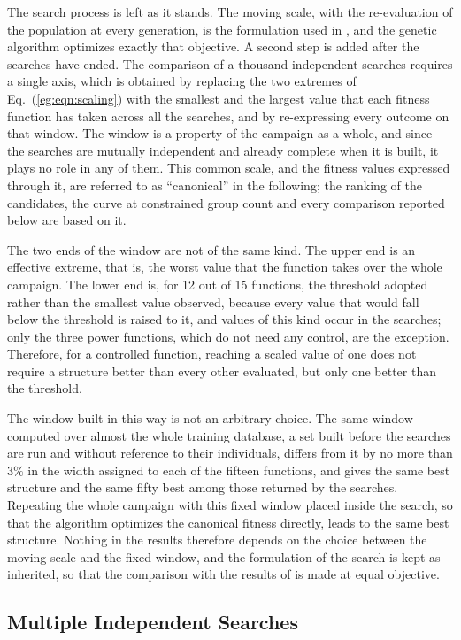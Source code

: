 The search process is left as it stands. The moving scale, with the
re-evaluation of the population at every generation, is the formulation used
in \citet{prevMulti}, and the genetic algorithm optimizes exactly that
objective. A second step is added after the searches have ended. The
comparison of a thousand independent searches requires a single axis, which is
obtained by replacing the two extremes of Eq.~(\ref{eg:eqn:scaling}) with the
smallest and the largest value that each fitness function has taken across all
the searches, and by re-expressing every outcome on that window. The window is
a property of the campaign as a whole, and since the searches are mutually
independent and already complete when it is built, it plays no role in any of
them. This common scale, and the fitness values expressed through it, are
referred to as ``canonical'' in the following; the ranking of the candidates,
the curve at constrained group count and every comparison reported below are
based on it.

The two ends of the window are not of the same kind. The upper end is an
effective extreme, that is, the worst value that the function takes over the
whole campaign. The lower end is, for 12 out of 15 functions, the threshold
adopted rather than the smallest value observed, because every value that would
fall below the threshold is raised to it, and values of this kind occur in the
searches; only the three power functions, which do not need any control, are
the exception. Therefore, for a controlled function, reaching a scaled value of one does not require a
structure better than every other evaluated, but only one better than the
threshold.

The window built in this way is not an arbitrary choice. The same window
computed over almost the whole training database, a set built before the
searches are run and without reference to their individuals, differs from it
by no more than $3\%$ in the width assigned to each of the fifteen functions,
and gives the same best structure and the same fifty best among those returned
by the searches. Repeating the whole campaign with this fixed window placed
inside the search, so that the algorithm optimizes the canonical fitness
directly, leads to the same best structure. Nothing in the results therefore
depends on the choice between the moving scale and the fixed window, and the
formulation of the search is kept as inherited, so that the comparison with
the results of \citet{prevMulti} is made at equal objective.

\subsection{Multiple Independent Searches}

